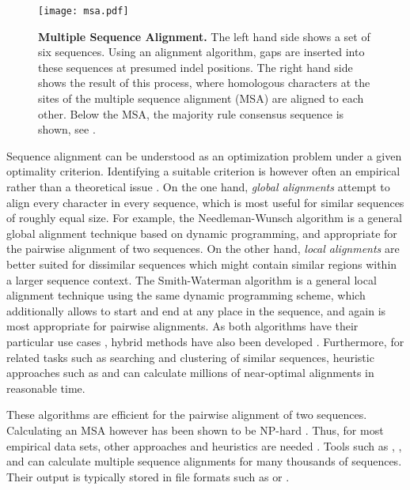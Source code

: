\begin{figure}[hpbt]
    \centering
    \texttt{[image: msa.pdf]}
    \caption[Multiple Sequence Alignment]{
        \textbf{Multiple Sequence Alignment.}
        The left hand side shows a set of six sequences.
        Using an alignment algorithm, gaps are inserted into these sequences at presumed indel positions.
        The right hand side shows the result of this process,
        where homologous characters at the sites of the multiple sequence alignment (MSA) are aligned to each other.
        Below the MSA, the majority rule consensus sequence is shown,
        see .
    }
    \label{fig:msa}
\end{figure}

Sequence alignment can be understood as an optimization problem under a given optimality criterion.
Identifying a suitable criterion is however often an empirical rather than a theoretical issue \cite{Vingron1994,Carroll2007}.
On the one hand, \emph{global alignments} attempt to align every character in every sequence,
which is most useful for similar sequences of roughly equal size.
For example, the Needleman-Wunsch algorithm \cite{Needleman1970} is a general global alignment technique
based on dynamic programming, and appropriate for the pairwise alignment of two sequences.
On the other hand, \emph{local alignments} are better suited for dissimilar sequences
which might contain similar regions within a larger sequence context.
The Smith-Waterman algorithm \cite{Smith1981} is a general local alignment technique
using the same dynamic programming scheme,
which additionally allows to start and end at any place in the sequence,
and again is most appropriate for pairwise alignments.
As both algorithms have their particular use cases \cite{Polyanovsky2011},
hybrid methods have also been developed \cite{Brudno2003}.
Furthermore, for related tasks such as searching and clustering of similar sequences,
heuristic approaches such as  \cite{Altschul1990} and
 \cite{Edgar2010} can calculate millions of near-optimal alignments in reasonable time.

These algorithms are efficient for the pairwise alignment of two sequences.
Calculating an MSA however has been shown to be NP-hard \cite{Wang1994,Just2001}.
Thus, for most empirical data sets, other approaches and heuristics are needed \cite{Thompson2011}.
Tools such as  \cite{Higgins1988},  \cite{Edgar2004}, and  \cite{Katoh2002}
can calculate multiple sequence alignments for many thousands of sequences.
Their output is typically stored in file formats
such as  \cite{Pearson1988} or  \cite{Felsenstein1981}.

